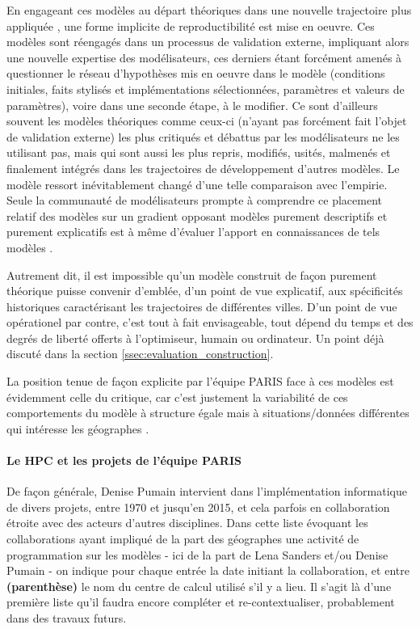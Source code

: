 En engageant ces modèles au départ théoriques dans une nouvelle trajectoire plus appliquée \autocite{Banos2013a}, une forme implicite de reproductibilité est mise en oeuvre. Ces modèles sont réengagés dans un processus de validation externe, impliquant alors une nouvelle expertise des modélisateurs, ces derniers étant forcément amenés à questionner le réseau d'hypothèses mis en oeuvre dans le modèle (conditions initiales, faits stylisés et implémentations sélectionnées, paramètres et valeurs de paramètres), voire dans une seconde étape, à le modifier. Ce sont d'ailleurs souvent les modèles théoriques comme ceux-ci (n'ayant pas forcément fait l'objet de validation externe) les plus critiqués et débattus par les modélisateurs ne les utilisant pas, mais qui sont aussi les plus repris, modifiés, usités, malmenés et finalement intégrés dans les trajectoires de développement d'autres modèles. Le modèle ressort inévitablement changé d'une telle comparaison avec l'empirie. Seule la communauté de modélisateurs prompte à comprendre ce placement relatif des modèles sur un gradient opposant modèles purement descriptifs et purement explicatifs est à même d'évaluer l'apport en connaissances de tels modèles \autocites{Bulle2005, Rouchier2013}.  %

Autrement dit, il est impossible qu'un modèle construit de façon purement théorique puisse convenir d'emblée, d'un point de vue explicatif, aux spécificités historiques caractérisant les trajectoires de différentes villes. D'un point de vue opérationel par contre, c'est tout à fait envisageable, tout dépend du temps et des degrés de liberté offerts à l'optimiseur, humain ou ordinateur. Un point déjà discuté dans la section \ref{ssec:evaluation_construction}.

La position tenue de façon explicite par l'équipe PARIS face à ces modèles est évidemment celle du critique, car c'est justement la variabilité de ces comportements du modèle à structure égale mais à situations/données différentes qui intéresse les géographes \autocite[99-103]{Pumain1989}.

\paragraph{Le HPC et les projets de l'équipe PARIS}

De façon générale, Denise Pumain intervient dans l’implémentation informatique de divers projets, entre 1970 et jusqu’en 2015, et cela parfois en collaboration étroite avec des acteurs d’autres disciplines. Dans cette liste évoquant les collaborations ayant impliqué de la part des géographes une activité de programmation sur les modèles - ici de la part de Lena Sanders et/ou Denise Pumain - on indique pour chaque entrée la date initiant la collaboration, et entre \textbf{(parenthèse)} le nom du centre de calcul utilisé s'il y a lieu. Il s'agit là d'une première liste qu'il faudra encore compléter et re-contextualiser, probablement dans des travaux futurs.

